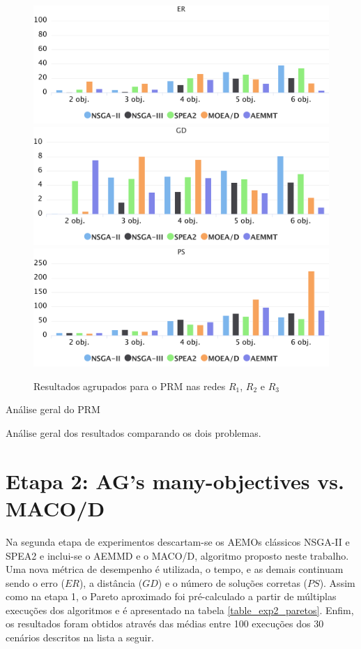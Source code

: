 \begin{figure}[!htbp]
	\caption{Resultados agrupados para o PRM nas redes $R_1$, $R_2$ e $R_3$}
	\label{fig_exp1_mrp_todos}
	\includegraphics[width=1\textwidth]{cap_experimentos/figs/er-mrp-todos}
	\includegraphics[width=1\textwidth]{cap_experimentos/figs/gd-mrp-todos}
	\includegraphics[width=1\textwidth]{cap_experimentos/figs/ps-mrp-todos}
\end{figure}

Análise geral do PRM

Análise geral dos resultados comparando os dois problemas.

\section{Etapa 2: AG's many-objectives vs. MACO/D}

Na segunda etapa de experimentos descartam-se os AEMOs clássicos NSGA-II e SPEA2 e inclui-se o AEMMD e o MACO/D, algoritmo proposto neste trabalho. Uma nova métrica de desempenho é utilizada, o tempo, e as demais continuam sendo o erro ($ER$), a distância ($GD$) e o número de soluções corretas ($PS$). Assim como na etapa 1, o Pareto aproximado foi pré-calculado a partir de múltiplas execuções dos algoritmos e é apresentado na tabela \ref{table_exp2_paretos}. Enfim, os resultados foram obtidos através das médias entre 100 execuções dos 30 cenários descritos na lista a seguir.

